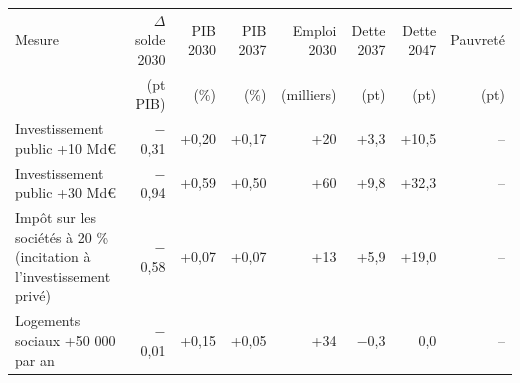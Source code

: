 \begin{tabular}{p{5.2cm}rrrrrrr}
\toprule
Mesure & $\Delta$solde 2030 & PIB 2030 & PIB 2037 & Emploi 2030 & Dette 2037 & Dette 2047 & Pauvreté \\
 & (pt PIB) & (\%) & (\%) & (milliers) & (pt) & (pt) & (pt) \\
\midrule
Investissement public +10 Md€ & $-$0{,}31 & +0{,}20 & +0{,}17 & +20 & +3{,}3 & +10{,}5 & -- \\
Investissement public +30 Md€ & $-$0{,}94 & +0{,}59 & +0{,}50 & +60 & +9{,}8 & +32{,}3 & -- \\
Impôt sur les sociétés à 20 \% (incitation à l'investissement privé) & $-$0{,}58 & +0{,}07 & +0{,}07 & +13 & +5{,}9 & +19{,}0 & -- \\
Logements sociaux +50 000 par an & $-$0{,}01 & +0{,}15 & +0{,}05 & +34 & $-$0{,}3 & 0{,}0 & -- \\
\bottomrule
\end{tabular}
